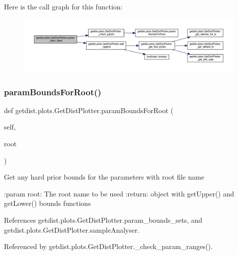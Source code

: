 Here is the call graph for this function\+:
\nopagebreak
\begin{figure}[H]
\begin{center}
\leavevmode
\includegraphics[width=350pt]{classgetdist_1_1plots_1_1GetDistPlotter_a9f6d27f2345ccb87720770ddb81258d5_cgraph}
\end{center}
\end{figure}
\mbox{\label{classgetdist_1_1plots_1_1GetDistPlotter_a199664f84496268527d58072eebcd724}} 
\subsubsection{\texorpdfstring{param\+Bounds\+For\+Root()}{paramBoundsForRoot()}}
{\footnotesize\ttfamily def getdist.\+plots.\+Get\+Dist\+Plotter.\+param\+Bounds\+For\+Root (\begin{DoxyParamCaption}\item[{}]{self,  }\item[{}]{root }\end{DoxyParamCaption})}

\begin{DoxyVerb}Get any hard prior bounds for the parameters with root file name

:param root: The root name to be used
:return: object with getUpper() and getLower() bounds functions
\end{DoxyVerb}
 

References getdist.\+plots.\+Get\+Dist\+Plotter.\+param\+\_\+bounds\+\_\+sets, and getdist.\+plots.\+Get\+Dist\+Plotter.\+sample\+Analyser.



Referenced by getdist.\+plots.\+Get\+Dist\+Plotter.\+\_\+check\+\_\+param\+\_\+ranges().

